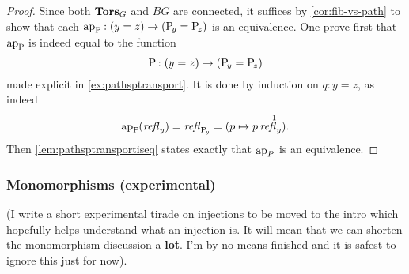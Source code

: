\begin{proof}
  Since both $\mathbf{Tors}_G$ and $BG$ are connected, it suffices by
  \cref{cor:fib-vs-path} to show that each
  $\mathop{\mathrm{ap}_{\mathrm{P}_{\!}}}:(y=z)\to(\mathrm{P}_{\!y}=\mathrm{P}_{\!z})$ is an
  equivalence. One prove first that $\mathop{\mathrm{ap}_{\mathrm{P}_{\!}}}$ is indeed equal
  to the function
  $$\mathrm{P}_{\!}:(y=z)\to(\mathrm{P}_{\!y}= \mathrm{P}_{\!z})$$
  made explicit in \cref{ex:pathsptransport}. It is done by induction
  on $q:y=z$, as indeed
  \begin{displaymath}
    \mathop{\mathrm{ap}_{\mathrm{P}_{\!}}}(\mathop{\mathit{refl}_{y}}) = \mathop{\mathit{refl}_{\mathrm{P}_{\!y}}} = (p\mapsto p\mathop{\mathit{refl}_{y}}^{-1}).
  \end{displaymath}
  Then \cref{lem:pathsptransportiseq} states exactly that $\mathop{\mathrm{ap}_{P}}$ is
  an equivalence.
%
%

\end{proof}

\subsubsection{Monomorphisms (experimental)}

(I write a short experimental tirade on injections to be moved to the intro which hopefully helps understand what an injection is.
It will mean that we can shorten the monomorphism discussion a {\bf lot}.
I'm by no means finished and it is safest to ignore this just for now).

